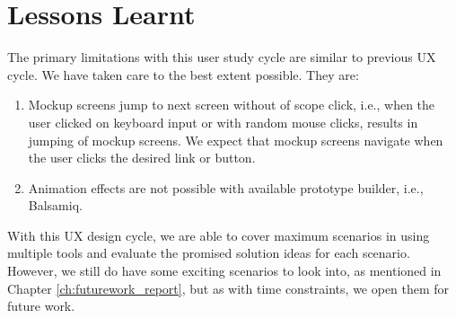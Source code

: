 \section{Lessons Learnt}

The primary limitations with this user study cycle are similar to previous UX cycle. We have taken care to the best extent possible. They are: \\

\begin{enumerate}
\item Mockup screens jump to next screen without of scope click, i.e., when the user clicked on keyboard input or with random mouse clicks, results in jumping of mockup screens. We expect that mockup screens navigate when the user clicks the desired link or button.
\item Animation effects are not possible with available prototype builder, i.e., Balsamiq.
\end{enumerate}

With this UX design cycle, we are able to cover maximum scenarios in using multiple tools and evaluate the promised solution ideas for each scenario. However, we still do have some exciting scenarios to look into, as mentioned in Chapter \ref{ch:futurework_report}, but as with time constraints, we open them for future work.

\emptypage